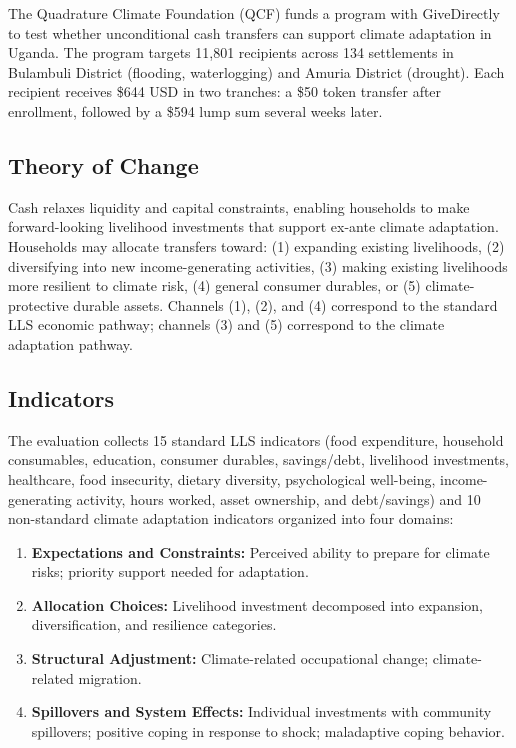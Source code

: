 \documentclass[12pt, oneside]{amsart}
\numberwithin{equation}{section}
\begin{document}
The Quadrature Climate Foundation (QCF) funds a program with GiveDirectly to test whether unconditional cash transfers can support climate adaptation in Uganda. The program targets 11,801 recipients across 134 settlements in Bulambuli District (flooding, waterlogging) and Amuria District (drought). Each recipient receives \$644 USD in two tranches: a \$50 token transfer after enrollment, followed by a \$594 lump sum several weeks later.

\subsection{Theory of Change}

Cash relaxes liquidity and capital constraints, enabling households to make forward-looking livelihood investments that support ex-ante climate adaptation. Households may allocate transfers toward: (1) expanding existing livelihoods, (2) diversifying into new income-generating activities, (3) making existing livelihoods more resilient to climate risk, (4) general consumer durables, or (5) climate-protective durable assets. Channels (1), (2), and (4) correspond to the standard LLS economic pathway; channels (3) and (5) correspond to the climate adaptation pathway.

\subsection{Indicators}

The evaluation collects 15 standard LLS indicators (food expenditure, household consumables, education, consumer durables, savings/debt, livelihood investments, healthcare, food insecurity, dietary diversity, psychological well-being, income-generating activity, hours worked, asset ownership, and debt/savings) and 10 non-standard climate adaptation indicators organized into four domains:

\begin{enumerate}
    \item \textbf{Expectations and Constraints:} Perceived ability to prepare for climate risks; priority support needed for adaptation.
    \item \textbf{Allocation Choices:} Livelihood investment decomposed into expansion, diversification, and resilience categories.
    \item \textbf{Structural Adjustment:} Climate-related occupational change; climate-related migration.
    \item \textbf{Spillovers and System Effects:} Individual investments with community spillovers; positive coping in response to shock; maladaptive coping behavior.
\end{enumerate}
\end{document}
